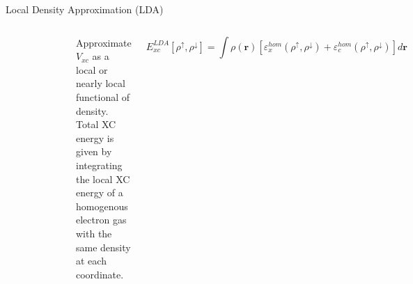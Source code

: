 \documentclass[aspectratio=169]{beamer}
\let \vec \mathbf
\begin{document}
\begin{frame}{Local Density Approximation (LDA)}

\begin{columns}
\begin{figure}
    \centering
    \includegraphics[width=0.8\linewidth]{lectures/figures/5_LDA.png}
    \end{figure}
Approximate $V_{xc}$ as a local or nearly local functional of density.\newline
\newline
Total XC energy is given by integrating the local XC energy of a homogenous electron gas with the same density at each coordinate.

\begin{equation*}
    E_{xc}^{LDA}[\rho^\uparrow, \rho^\downarrow] = \int \rho(\vec{r})[\varepsilon_x^{hom}(\rho^\uparrow, \rho^\downarrow)+\varepsilon_c^{hom}(\rho^\uparrow, \rho^\downarrow)] d\vec{r}
\end{equation*}

\end{columns} 

\end{frame} 
\end{document}
